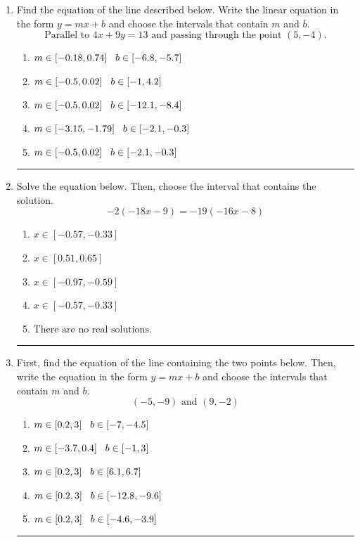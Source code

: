 \documentclass[14pt]{extbook}
\newcommand{\litem}[1]{\item#1\hspace*{-1cm}\rule{\textwidth}{0.4pt}}
\begin{document}
\begin{enumerate}
{\begin{enumerate}[label=\Alph*.]
\end{enumerate} }
\litem{
Find the equation of the line described below. Write the linear equation in the form $ y=mx+b $ and choose the intervals that contain $m$ and $b$.\[ \text{Parallel to } 4 x + 9 y = 13 \text{ and passing through the point } (5, -4). \]\begin{enumerate}[label=\Alph*.]
\item \( m \in [-0.18, 0.74] \hspace*{3mm} b \in [-6.8, -5.7] \)
\item \( m \in [-0.5, 0.02] \hspace*{3mm} b \in [-1, 4.2] \)
\item \( m \in [-0.5, 0.02] \hspace*{3mm} b \in [-12.1, -8.4] \)
\item \( m \in [-3.15, -1.79] \hspace*{3mm} b \in [-2.1, -0.3] \)
\item \( m \in [-0.5, 0.02] \hspace*{3mm} b \in [-2.1, -0.3] \)

\end{enumerate} }
\litem{
Solve the equation below. Then, choose the interval that contains the solution.\[ -2(-18x -9) = -19(-16x -8) \]\begin{enumerate}[label=\Alph*.]
\item \( x \in [-0.57, -0.33] \)
\item \( x \in [0.51, 0.65] \)
\item \( x \in [-0.97, -0.59] \)
\item \( x \in [-0.57, -0.33] \)
\item \( \text{There are no real solutions.} \)

\end{enumerate} }
\litem{
First, find the equation of the line containing the two points below. Then, write the equation in the form $ y=mx+b $ and choose the intervals that contain $m$ and $b$.\[ (-5, -9) \text{ and } (9, -2) \]\begin{enumerate}[label=\Alph*.]
\item \( m \in [0.2, 3] \hspace*{3mm} b \in [-7, -4.5] \)
\item \( m \in [-3.7, 0.4] \hspace*{3mm} b \in [-1, 3] \)
\item \( m \in [0.2, 3] \hspace*{3mm} b \in [6.1, 6.7] \)
\item \( m \in [0.2, 3] \hspace*{3mm} b \in [-12.8, -9.6] \)
\item \( m \in [0.2, 3] \hspace*{3mm} b \in [-4.6, -3.9] \)


\end{enumerate}}
\end{enumerate}
\end{document}
